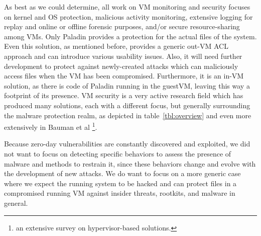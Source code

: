 \par As best as we could determine, all work on \ac{VM} monitoring and security focuses on kernel and \ac{OS} protection, malicious activity monitoring, extensive logging for replay and online or offline forensic purposes, and/or secure resource-sharing among \ac{VM}s. Only Paladin \cite{baliga2008automated} provides a protection for the actual files of the system. Even this solution, as mentioned before, provides a generic out-\ac{VM} \ac{ACL} approach and can introduce various usability issues. Also, it will need further development to protect against newly-created attacks which can maliciously access files when the \ac{VM} has been compromised. Furthermore, it is an in-\ac{VM} solution, as there is code of Paladin running in the guest\ac{VM}, leaving this way a footprint of its presence. \ac{VM} security is a very active research field which has produced many solutions, each with a different focus, but generally surrounding the malware protection realm, as depicted in table~\ref{tbl:overview} and even more extensively in Bauman et al \cite{bauman2015survey}\footnote{an extensive survey on hypervisor-based solutions.}.


\par Because zero-day vulnerabilities are constantly discovered and exploited, we did not want to focus on detecting specific behaviors to assess the presence of malware and methods to restrain it, since these behaviors change and evolve with the development of new attacks. We do want to focus on a more generic case where we expect the running system to be hacked and can protect files in a compromised running \ac{VM} against insider threats, rootkits, and malware in general. 




